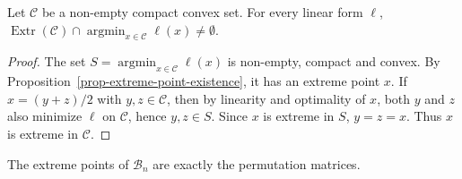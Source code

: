 \begin{prop}\label{prop-linear-program-extreme-minimizer}
Let $\mathcal C$ be a non-empty compact convex set. For every linear form $\ell$, \(\operatorname{Extr}(\mathcal C)\cap\operatorname*{argmin}_{x\in\mathcal C}\ell(x) \neq\emptyset.\)
\end{prop}
\begin{proof}
The set $S=\operatorname*{argmin}_{x\in\mathcal C}\ell(x)$ is non-empty, compact and convex. By Proposition~\ref{prop-extreme-point-existence}, it has an extreme point $x$. If $x=(y+z)/2$ with $y,z\in\mathcal C$, then by linearity and optimality of $x$, both $y$ and $z$ also minimize $\ell$ on $\mathcal C$, hence $y,z\in S$. Since $x$ is extreme in $S$, $y=z=x$. Thus $x$ is extreme in $\mathcal C$.
\end{proof}
\begin{thm}\label{thm-birkhoff-von-neumann}
The extreme points of $\mathcal B_n$ are exactly the permutation matrices.
\end{thm}
